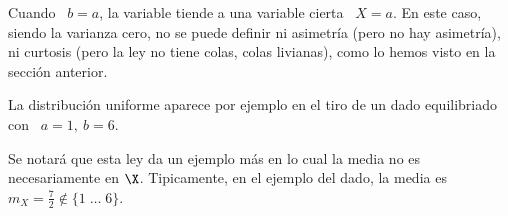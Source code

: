 Cuando \ $b  = a$, la variable tiende a  una variable cierta \ $X  = a$. En este
caso, siendo la  varianza cero, no se puede definir ni  asimetr\'ia (pero no hay
asimetr\'ia), ni curtosis (pero la ley no tiene colas, \ie colas livianas), como
lo hemos visto en la secci\'on anterior.
%

La  distribuci\'on  uniforme  aparece  por   ejemplo  en  el  tiro  de  un  dado
equilibriado con \ $a = 1, \: b = 6$.


Se  notar\'a que  esta  ley da  un  ejemplo m\'as  en  lo cual  la  media no  es
necesariamente en $\X$. Tipicamente, en el  ejemplo del dado, la media es $m_X =
\frac72 \not\in \{ 1 \; \ldots \; 6 \}$.
